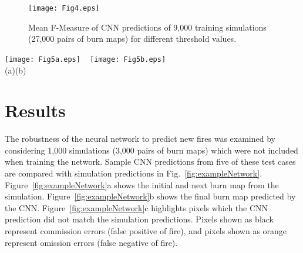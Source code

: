 \documentclass[smallcondensed]{svjour3}     %
\begin{document}
\begin{figure}[htbp]
\centering
  \texttt{[image: Fig4.eps]}
\caption{Mean F-Measure of CNN predictions of 9,000 training simulations (27,000 pairs of burn maps) for different threshold values.}
\label{fig:fMeasureVsThreshold}       %
\end{figure}

\begin{figure*}[htb]
	\centering
	\texttt{[image: Fig5a.eps]}
	~
	\texttt{[image: Fig5b.eps]}
	\\
	(a)\hspace{0.46\textwidth}(b)
\caption{Example CNN prediction of burn map probability (a) Directly predicted from CNN (b) After post-processing}
\label{fig:postProcess}       %
\end{figure*}











\section{Results}
\label{s:Results}

The robustness of the neural network to predict new fires was examined
by considering 1,000 simulations (3,000 pairs of burn maps) which were not
included when training the network.
Sample CNN predictions from five of these test cases are
compared with simulation predictions in Fig.~\ref{fig:exampleNetwork}.
Figure~\ref{fig:exampleNetwork}a shows the initial and next burn map
from the simulation.
Figure~\ref{fig:exampleNetwork}b shows the final burn map predicted by the CNN.
Figure~\ref{fig:exampleNetwork}c highlights pixels which the CNN prediction did not match
the simulation predictions. Pixels shown as black represent commission
errors (false positive of fire), and pixels shown as orange represent omission errors
(false negative of fire).
\end{document}
